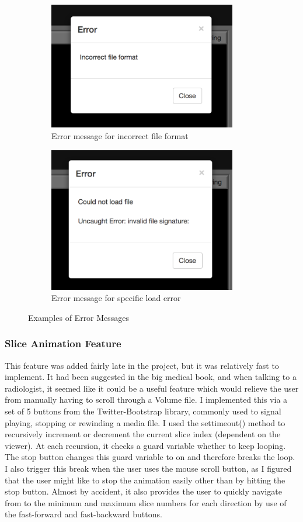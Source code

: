 \documentclass[a4paper,11pt,titlepage]{article}
\begin{document}
\begin{figure}
\centering
\begin{subfigure}{.5\textwidth}
  \centering
  \includegraphics[width=82mm]{graphics/error_01.png}
  \caption{Error message for incorrect file format}
\end{subfigure}%
\begin{subfigure}{.5\textwidth}
  \centering
  \includegraphics[width=82mm]{graphics/error_02.png}
  \caption{Error message for specific load error}
\end{subfigure}
\caption{Examples of Error Messages}

\end{figure}



\subsubsection{Slice Animation Feature}

This feature was added fairly late in the project, but it was relatively fast to implement. It had been suggested in the big medical book, and when talking to a radiologist, it seemed like it could be a useful feature which would relieve the user from manually having to scroll through a Volume file. I implemented this via a set of 5 buttons from the Twitter-Bootstrap library, commonly used to signal playing, stopping or rewinding a media file. I used the settimeout() method to recursively increment or decrement the current slice index (dependent on the viewer). At each recursion, it checks a guard variable whether to keep looping. The stop button changes this guard variable to on and therefore breaks the loop. I also trigger this break when the user uses the mouse scroll button, as I figured that the user might like to stop the animation easily other than by hitting the stop button. Almost by accident, it also provides the user to quickly navigate from to the minimum and maximum slice numbers for each direction by use of the fast-forward and fast-backward buttons.
\end{document}
